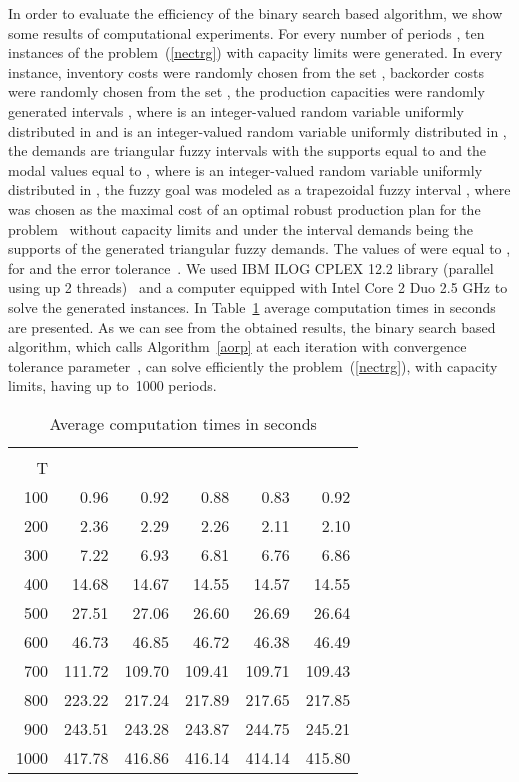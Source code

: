 \documentclass[11pt]{article}
\begin{document}
In order to evaluate the efficiency of the binary search based algorithm,  we show some results of computational
experiments.
For every number of periods , ten instances of the problem~(\ref{nectrg}) with capacity limits
were generated. In every instance, inventory costs were randomly chosen from the set , backorder costs were randomly chosen from the set , the production capacities were randomly generated intervals , where  is an 
integer-valued  random variable uniformly distributed in  and  is an integer-valued random variable uniformly distributed in ,
the demands are  triangular fuzzy intervals with the supports equal to  and the modal values equal 
to , where  is an integer-valued random variable uniformly distributed in ,
the fuzzy goal  was modeled as a trapezoidal  fuzzy interval 
, where  
was chosen as
the maximal cost of an optimal robust production 
plan for the problem~ without capacity limits 
and under the interval demands being the supports 
of the generated triangular fuzzy demands.
The values of  were equal to , for 
and the error tolerance~.
We used  IBM ILOG CPLEX 12.2 library  (parallel using up 2 threads)~\cite{CPLEX}
 and a
 computer equipped with Intel Core 2 Duo 2.5 GHz to solve the generated instances.
In Table~\ref{tab2new} average  computation times in seconds are presented.
As we can see from the obtained results, 
the binary search based algorithm, which calls Algorithm~\ref{aorp}
at each iteration with 
convergence tolerance parameter~, 
can solve efficiently the problem~(\ref{nectrg}),  with capacity limits, having up to~1000 periods.
\begin{table}
\begin{small}
\setlength{\tabcolsep}{4pt}
\caption{Average computation times in seconds} \label{tab2new}
\begin{center}
\begin{tabular}{r|rrrrr}
&\multicolumn{5}{c}{}\\
 \cline{2-6}
T & &   &  & &  \\
\hline 
100 & 0.96 &  0.92 &   0.88 &   0.83 &  0.92 \\ 
200 &  2.36  &   2.29 &  2.26  &  2.11  & 2.10   \\ 
300 &  7.22 &  6.93 &  6.81 &  6.76 &  6.86 \\ 
400 &  14.68 &  14.67 &  14.55 &  14.57 & 14.55  \\ 
500 &  27.51 &  27.06 &  26.60 & 26.69  & 26.64  \\ 
600 &  46.73 &  46.85 &  46.72 &  46.38 &  46.49 \\ \
700 &  111.72 &  109.70 & 109.41  & 109.71  & 109.43  \\ 
800 &  223.22 & 217.24  & 217.89  &  217.65 & 217.85 \\ 
900 &  243.51 &  243.28 &  243.87 &  244.75 &  245.21 \\ 
1000 &  417.78 &  416.86 &  416.14 &  414.14 & 415.80  \\
\end{tabular}
\end{center}
\end{small}
\end{table}
\end{document}
